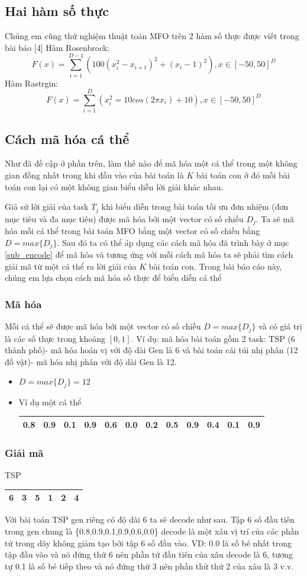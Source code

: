 \documentclass[a4paper,12pt]{report}
\begin{document}
\subsection{Hai hàm số thực} 
Chúng em cũng thử nghiệm thuật toán MFO trên 2 hàm số thực được viết trong bài báo [4]
Hàm Rosenbrock: 
$$F(x)=\sum_{i=1}^{D-1}(100(x_i^2-x_{i+1})^2+(x_i-1)^2),x \in [-50,50]^D $$
Hàm Rastrgin:
$$F(x)=\sum_{i=1}^D(x_i^2=10cos(2\pi x_i)+10),x \in [-50,50]^D$$
\subsection{Cách mã hóa cá thể}
Như đã đề cập ở phần trên, làm thế nào để mã hóa một cá thể trong một không gian đồng nhất trong khi đầu vào của bài toán là $K$ bài toán con ở đó mỗi bài toán con lại có một không gian biểu diễn lời giải khác nhau.
\par Giả sử lời giải của task $T_j$ khi biểu diễn trong bài toán tối ưu đơn nhiệm (đơn mục tiêu và đa mục tiêu) được mã hóa bởi một vector có số chiều $D_j$. Ta sẽ mã hóa mỗi cá thể trong bài toán MFO bằng một vector có số chiều bằng $D = max\{D_j\}$. Sau đó ta có thể áp dụng các cách mã hóa đã trình bày ở mục \ref{sub_encode}  để mã hóa và tương ứng với mỗi cách mã hóa ta sẽ phải tìm cách giải mã từ một cá thể ra lời giải của $K$ bài toán con. Trong bài báo cáo này, chúng em lựa chọn cách mã hóa số thực để biểu diễn cá thể
\subsubsection{Mã hóa}
Mỗi cá thể sẽ được mã hóa bởi một vector có số chiều $D = max\{D_j\}$ và có giá trị là các số thực trong khoảng $[0,1]$. Ví dụ: mã hóa bài toán gồm 2 task: TSP (6 thành phố)- mã hóa hoán vị với độ dài Gen là 6 và bài toán cái túi nhị phân (12 đồ vật)- mã hóa nhị phân với độ dài Gen là 12.
\begin{itemize}
\item $D = max\{D_j\} = 12$
\item Ví dụ một cá thể 
\begin{longtable}{|c|c|c|c|c|c|c|c|c|c|c|c|}
\hline
0.8 & 0.9 & 0.1 & 0.9 & 0.6 & 0.0 & 0.2 & 0.5 & 0.9 & 0.4 & 0.1 & 0.9\\
\hline
\end{longtable}\end{itemize}

\subsubsection{Giải mã}
TSP
\begin{longtable}{|c|c|c|c|c|c|}
\hline
6& 3& 5& 1& 2& 4\\
\hline
\end{longtable}
Với bài toán TSP gen riêng có độ dài 6 ta sẽ decode như sau. Tập 6 số đầu tiên trong gen chung là \{0.8,0.9,0.1,0.9,0.6,0.0\} decode là một xâu vị trí của các phần tử trong dãy không giảm tạo bởi tập 6 số đầu vào. VD: 0.0 là số bé nhất trong tập đầu vào và nó đứng thứ 6 nên phần tử đầu tiên của xâu decode là 6, tương tự 0.1 là số bé tiếp theo và nó đứng thứ 3 nên phần thử thứ 2 của xâu là 3 v.v.
\end{document}
